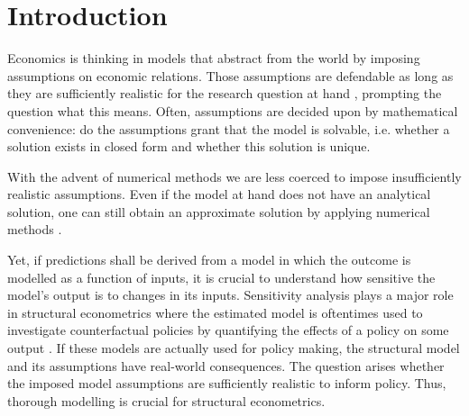 \section{Introduction} \label{intro}


Economics is thinking in models that abstract from the world by imposing assumptions on economic relations. Those assumptions are defendable as long as they are sufficiently realistic for the research question at hand \citep{F53}, prompting the question what this means. Often, assumptions are decided upon by mathematical convenience: do the assumptions grant that the model is solvable, i.e. whether a solution exists in closed form and whether this solution is unique.



With the advent of numerical methods we are less coerced to impose insufficiently realistic assumptions. Even if the model at hand does not have an analytical solution, one can still obtain an approximate solution by applying numerical methods \citep{MF04}.


Yet, if predictions shall be derived from a model in which the outcome is modelled as a function of inputs, it is crucial to understand how sensitive the model’s output is to changes in its inputs. Sensitivity analysis plays a major role in structural econometrics where the estimated model is oftentimes used to investigate counterfactual policies by quantifying the effects of a policy on some output \citep{LM17}. If these models are actually used for policy making, the structural model and its assumptions have real-world consequences. The question arises whether the imposed model assumptions are sufficiently realistic to inform policy. Thus, thorough modelling is crucial for structural econometrics.


